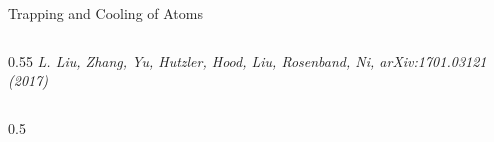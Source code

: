 \documentclass[final]{beamer}
\newlength{\coltwowid}
\begin{document}
\begin{frame}[t]
\begin{columns}[t]
\begin{column}{\coltwowid}
\begin{block}{Trapping and Cooling of Atoms}
\begin{columns}[T]
\begin{column}{0.55\coltwowid}
            \textit{\small L. Liu, Zhang, Yu, Hutzler, Hood, Liu, Rosenband, Ni,
              arXiv:1701.03121 (2017)}
          \end{column}
        \end{columns}
        \begin{columns}[T]
          \begin{column}{0.5\coltwowid}
            \vspace{1ex}
            \begin{center}
\end{center}
\end{column}
\end{columns}
\end{block}
\end{column}
\end{columns}
\end{frame}
\end{document}
